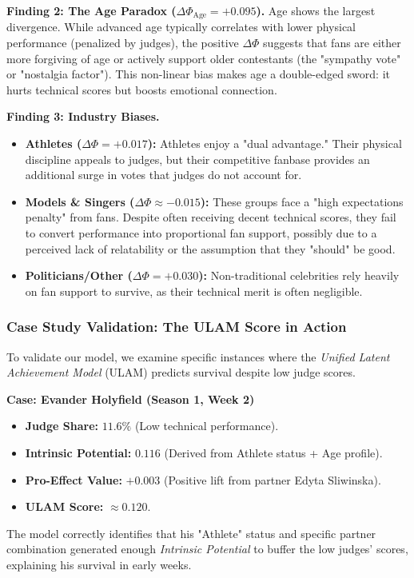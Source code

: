 \documentclass[12pt]{article}
\begin{document}
\textbf{Finding 2: The Age Paradox ($\Delta \Phi_{\text{Age}} = +0.095$).}
Age shows the largest divergence. While advanced age typically correlates with lower physical performance (penalized by judges), the positive $\Delta \Phi$ suggests that fans are either more forgiving of age or actively support older contestants (the "sympathy vote" or "nostalgia factor"). This non-linear bias makes age a double-edged sword: it hurts technical scores but boosts emotional connection.

\textbf{Finding 3: Industry Biases.}
\begin{itemize}
    \item \textbf{Athletes ($\Delta \Phi = +0.017$):} Athletes enjoy a "dual advantage." Their physical discipline appeals to judges, but their competitive fanbase provides an additional surge in votes that judges do not account for.
    \item \textbf{Models \& Singers ($\Delta \Phi \approx -0.015$):} These groups face a "high expectations penalty" from fans. Despite often receiving decent technical scores, they fail to convert performance into proportional fan support, possibly due to a perceived lack of relatability or the assumption that they "should" be good.
    \item \textbf{Politicians/Other ($\Delta \Phi = +0.030$):} Non-traditional celebrities rely heavily on fan support to survive, as their technical merit is often negligible.
\end{itemize}

\subsubsection{Case Study Validation: The ULAM Score in Action}

To validate our model, we examine specific instances where the \textit{Unified Latent Achievement Model} (ULAM) predicts survival despite low judge scores.

\textbf{Case: Evander Holyfield (Season 1, Week 2)}
\begin{itemize}
    \item \textbf{Judge Share:} $11.6\%$ (Low technical performance).
    \item \textbf{Intrinsic Potential:} $0.116$ (Derived from Athlete status + Age profile).
    \item \textbf{Pro-Effect Value:} $+0.003$ (Positive lift from partner Edyta Sliwinska).
    \item \textbf{ULAM Score:} $\approx 0.120$.
\end{itemize}
The model correctly identifies that his "Athlete" status and specific partner combination generated enough \textit{Intrinsic Potential} to buffer the low judges' scores, explaining his survival in early weeks.
\end{document}
